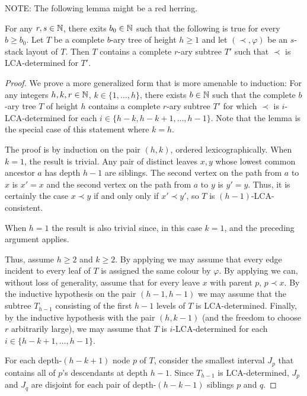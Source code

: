 \documentclass[kpfonts]{patmorin}
\begin{document}
NOTE: The following lemma might be a red herring.
\begin{lem}
  For any $r,s\in\mathbb{N}$, there exits $b_0\in\mathbb{N}$ such that the following is true for every $b\ge b_0$.  Let $T$ be a complete $b$-ary tree of height $h\ge 1$ and let $(\prec,\varphi)$ be an $s$-stack layout of $T$.  Then $T$ contains a complete $r$-ary subtree $T'$ such that $\prec$ is LCA-determined for $T'$.
\end{lem}

\begin{proof}
  We prove a more generalized form that is more amenable to induction:  
  For any integers $h,k,r\in \mathbb{N}$, $k\in\{1,\ldots,h\}$, there exists $b\in\mathbb{N}$ such that the complete $b$-ary tree $T$ of height $h$ contains a complete $r$-ary subtree $T'$ for which $\prec$ is $i$-LCA-determined for each $i\in\{h-k,h-k+1,\ldots,h-1\}$.  Note that the lemma is the special case of this statement where $k=h$.
  
  The proof is by induction on the pair $(h,k)$, ordered lexicographically.
  When $k=1$, the result is trivial.  Any pair of distinct leaves $x,y$ whose lowest common ancestor $a$ has depth $h-1$ are siblings.  The second vertex on the path from $a$ to $x$ is $x'=x$ and the second vertex on the path from $a$ to $y$ is $y'=y$.  Thus, it is certainly the case $x\prec y$ if and only only if $x'\prec y'$, so $T$ is $(h-1)$-LCA-consistent.
  
  When $h=1$ the result is also trivial since, in this case $k=1$, and the preceding argument applies.
  
  Thus, assume $h\ge 2$ and $k\ge 2$. By applying  we may assume that every edge incident to every leaf of $T$ is assigned the same colour by $\varphi$.  By applying  we can, without loss of generality, assume that for every leave $x$ with parent $p$, $p\prec x$.  By the inductive hypothesis on the pair $(h-1,h-1)$ we may assume that the subtree $T_{h-1}$ consisting of the first $h-1$ levels of $T$ is LCA-determined.  Finally, by the inductive hypothesis with the pair $(h,k-1)$ (and the freedom to choose $r$ arbitrarily large), we may assume that $T$ is $i$-LCA-determined for each $i\in\{h-k+1,\ldots,h-1\}$. 

  For each depth-$(h-k+1)$ node $p$ of $T$, consider the smallest interval $J_p$ that contains all of $p$'s descendants at depth $h-1$.  Since $T_{h-1}$ is LCA-determined, $J_p$ and $J_q$ are disjoint for each pair of depth-$(h-k-1)$ siblings $p$ and $q$.


\end{proof}
\end{document}
